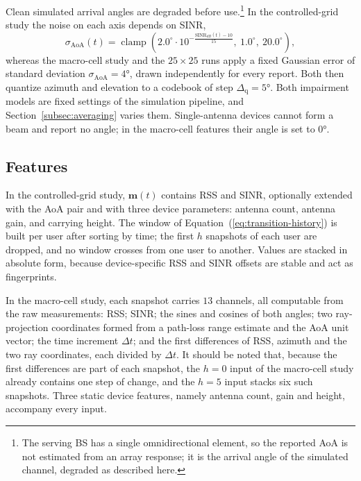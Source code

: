 Clean simulated arrival angles are degraded before use.\footnote{The serving BS has a single omnidirectional element, so the reported AoA is not estimated from an array response; it is the arrival angle of the simulated channel, degraded as described here.} In the controlled-grid study the noise on each axis depends on SINR,
\begin{equation}
  \sigma_{\text{AoA}}(t) = \operatorname{clamp}\!\left(2.0^\circ \cdot 10^{-\frac{\mathrm{SINR}_{dB}(t)-10}{15}},\ 1.0^\circ,\ 20.0^\circ\right),
  \label{eq:aoa-noise}
\end{equation}
whereas the macro-cell study and the $25\times25$ runs apply a fixed Gaussian error of standard deviation $\sigma_{\text{AoA}} = \ang{4}$, drawn independently for every report. Both then quantize azimuth and elevation to a codebook of step $\Delta_{\text{q}} = \ang{5}$. Both impairment models are fixed settings of the simulation pipeline, and Section~\ref{subsec:averaging} varies them. Single-antenna devices cannot form a beam and report no angle; in the macro-cell features their angle is set to \ang{0}.

\subsection{Features}
\label{subsec:features}

In the controlled-grid study, $\mathbf{m}(t)$ contains RSS and SINR, optionally extended with the AoA pair and with three device parameters: antenna count, antenna gain, and carrying height. The window of Equation~(\ref{eq:transition-history}) is built per user after sorting by time; the first $h$ snapshots of each user are dropped, and no window crosses from one user to another. Values are stacked in absolute form, because device-specific RSS and SINR offsets are stable and act as fingerprints.

In the macro-cell study, each snapshot carries $13$ channels, all computable from the raw measurements: RSS; SINR; the sines and cosines of both angles; two ray-projection coordinates formed from a path-loss range estimate and the AoA unit vector; the time increment $\Delta t$; and the first differences of RSS, azimuth and the two ray coordinates, each divided by $\Delta t$. It should be noted that, because the first differences are part of each snapshot, the $h=0$ input of the macro-cell study already contains one step of change, and the $h=5$ input stacks six such snapshots. Three static device features, namely antenna count, gain and height, accompany every input.

